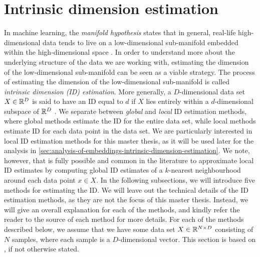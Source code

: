 \section{Intrinsic dimension estimation}
\label{sec:intrinsic-dimension-estimation}
In machine learning, the \textit{manifold hypothesis} states that in general, real-life high-dimensional data tends to live on a low-dimensional sub-manifold embedded within the high-dimensional space \cite[p. 16]{bengio2014representation}. In order to understand more about the underlying structure of the data we are working with, estimating the dimension of the low-dimensional sub-manifold can be seen as a viable strategy. The process of estimating the dimension of the low-dimensional sub-manifold is called \textit{intrinsic dimension (ID) estimation}. More generally, a $D$-dimensional data set $X \in \mathbb{R}^D$ is said to have an ID equal to $d$ if $X$ lies entirely within a $d$-dimensional subspace of $\mathbb{R}^D$ \cite{lee2015intrinsic}. We separate between \textit{global} and \textit{local} ID estimation methods, where global methods estimate the ID for the entire data set, while local methods estimate ID for each data point in the data set. We are particularly interested in local ID estimation methods for this master thesis, as it will be used later for the analysis  in \cref{sec:analysis-of-embeddings-intrinsic-dimension-estimation}. We note, however, that is fully possible and common in the literature to approximate local ID estimates by computing global ID estimates of a $k$-nearest neighbourhood around each data point $x \in X$. In the following subsections, we will introduce five methods for estimating the ID. We will leave out the technical details of the ID estimation methods, as they are not the focus of this master thesis. Instead, we will give an overall explanation for each of the methods, and kindly refer the reader to the source of each method for more details. For each of the methods described below, we assume that we have some data set $X \in \mathbb{R}^{N \times D}$ consisting of $N$ samples, where each sample is a $D$-dimensional vector. This section is based on \cite{lee2015intrinsic}, if not otherwise stated.

